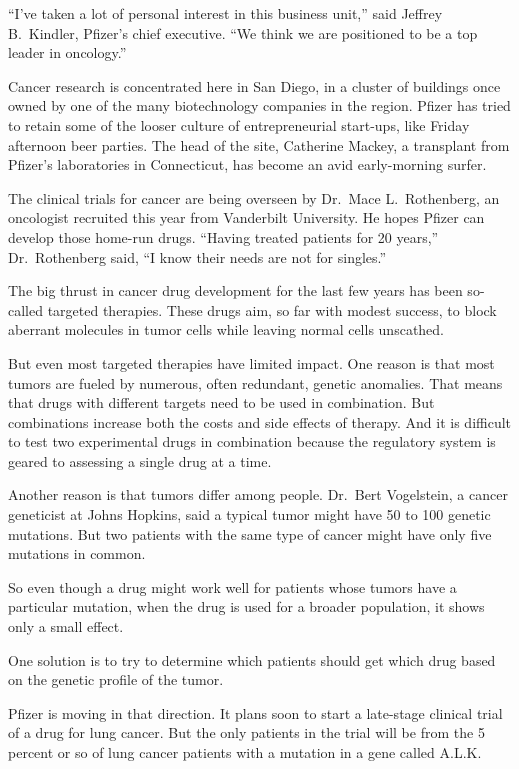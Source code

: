 ﻿\documentclass[12pt]{article}
\begin{document}
``I've taken a lot of personal interest in this business unit,'' said Jeffrey B.~Kindler, Pfizer's
chief executive. ``We think we are positioned to be a top leader in oncology.''

Cancer research is concentrated here in San Diego, in a cluster of buildings once owned by one of
the many biotechnology companies in the region. Pfizer has tried to retain some of the looser
culture of entrepreneurial start-ups, like Friday afternoon beer parties. The head of the site,
Catherine Mackey, a transplant from Pfizer's laboratories in Connecticut, has become an avid
early-morning surfer.

The clinical trials for cancer are being overseen by Dr.~Mace L.~Rothenberg, an oncologist recruited
this year from Vanderbilt University. He hopes Pfizer can develop those home-run drugs. ``Having
treated patients for 20 years,'' Dr.~Rothenberg said, ``I know their needs are not for singles.''

The big thrust in cancer drug development for the last few years has been so-called targeted
therapies. These drugs aim, so far with modest success, to block aberrant molecules in tumor cells
while leaving normal cells unscathed.

But even most targeted therapies have limited impact. One reason is that most tumors are fueled by
numerous, often redundant, genetic anomalies. That means that drugs with different targets need to
be used in combination. But combinations increase both the costs and side effects of therapy. And it
is difficult to test two experimental drugs in combination because the regulatory system is geared
to assessing a single drug at a time.

Another reason is that tumors differ among people. Dr.~Bert Vogelstein, a cancer geneticist at Johns
Hopkins, said a typical tumor might have 50 to 100 genetic mutations. But two patients with the same
type of cancer might have only five mutations in common.

So even though a drug might work well for patients whose tumors have a particular mutation, when the
drug is used for a broader population, it shows only a small effect.

One solution is to try to determine which patients should get which drug based on the genetic
profile of the tumor.

Pfizer is moving in that direction. It plans soon to start a late-stage clinical trial of a drug for
lung cancer. But the only patients in the trial will be from the 5 percent or so of lung cancer
patients with a mutation in a gene called A.L.K.
\end{document}
